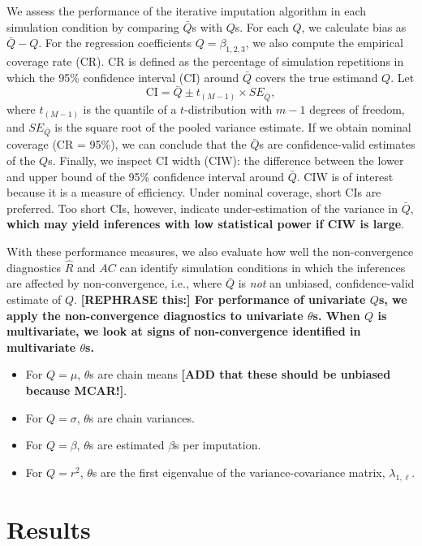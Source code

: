 \documentclass[Royal,times,sageh]{sagej}
\begin{document}
We assess the performance of the iterative imputation algorithm in each simulation condition by comparing \(\bar{Q}\)s with \(Q\)s. For each \(Q\), we calculate bias as \(\bar{Q} - Q\). For the regression coefficients \(Q=\beta_{1,2,3}\), we also compute the empirical coverage rate (CR). CR is defined as the percentage of simulation repetitions in which the 95\% confidence interval (CI) around \(\bar{Q}\) covers the true estimand \(Q\). Let
\[\text{CI} = \bar{Q} \pm t_{(M-1)} \times SE_{\bar{Q}},\]
where \(t_{(M-1)}\) is the quantile of a \(t\)-distribution with \(m-1\) degrees of freedom, and \(SE_{\bar{Q}}\) is the square root of the pooled variance estimate. If we obtain nominal coverage (CR = 95\%), we can conclude that the \(\bar{Q}\)s are confidence-valid estimates of the \(Q\)s. Finally, we inspect CI width (CIW): the difference between the lower and upper bound of the 95\% confidence interval around \(\bar{Q}\). CIW is of interest because it is a measure of efficiency. Under nominal coverage, short CIs are preferred. Too short CIs, however, indicate under-estimation of the variance in \(\bar{Q}\), \textbf{which may yield inferences with low statistical power if CIW is large}.

With these performance measures, we also evaluate how well the non-convergence diagnostics \(\widehat{R}\) and \(AC\) can identify simulation conditions in which the inferences are affected by non-convergence, i.e., where \(\bar{Q}\) is \emph{not} an unbiased, confidence-valid estimate of \(Q\). \textbf{{[}REPHRASE this:{]} For performance of univariate \(Q\)s, we apply the non-convergence diagnostics to univariate \(\theta\)s. When \(Q\) is multivariate, we look at signs of non-convergence identified in multivariate \(\theta\)s.}

\begin{itemize}
\item
  For \(Q=\mu\), \(\theta\)s are chain means \textbf{{[}ADD that these should be unbiased because MCAR!{]}}.
\item
  For \(Q=\sigma\), \(\theta\)s are chain variances.
\item
  For \(Q=\beta\), \(\theta\)s are estimated \(\beta\)s per imputation.
\item
  For \(Q=r^2\), \(\theta\)s are the first eigenvalue of the variance-covariance matrix, \(\lambda_{1,\ell}\).
\end{itemize}

\hypertarget{results}{%
\section{Results}\label{results}}
\end{document}

